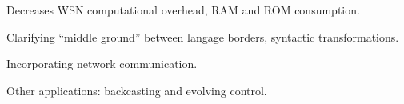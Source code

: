 Decreases WSN computational overhead, RAM and ROM consumption. 
\stopslide


\begin{citemize}
\item Clarifying ``middle ground'' between langage borders, syntactic transformations.
\item Incorporating network communication. 
\item Other applications: backcasting and evolving control.
\end{citemize}
\stopslide


\makeatletter
{}
\makeatother
\stopslide
